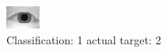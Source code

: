 \begin{figure}[h!]
\begin{center}
\includegraphics[width=0.60\columnwidth]{figures/ID864_class_1_target_2.png}
\end{center}
\caption{ Classification: 1 actual target: 2}
\label{fig:ID864_class_1_target_2}
\end{figure}
